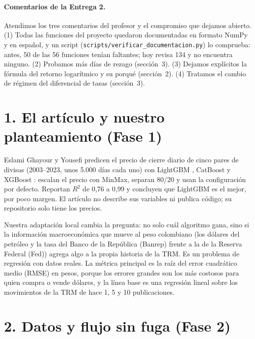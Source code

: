 \documentclass[11pt,letterpaper]{article}
\begin{document}
\paragraph{Comentarios de la Entrega 2.} Atendimos los tres comentarios del profesor y el compromiso que dejamos abierto. (1) Todas las funciones del proyecto quedaron documentadas en formato NumPy y en español, y un script (\texttt{scripts/verificar\_documentacion.py}) lo comprueba: antes, 50 de las 56 funciones tenían faltantes; hoy revisa 134 y no encuentra ninguno. (2) Probamos más días de rezago (sección~3). (3) Dejamos explícitos la fórmula del retorno logarítmico y su porqué (sección~2). (4) Tratamos el cambio de régimen del diferencial de tasas (sección~3).

\section*{1. El artículo y nuestro planteamiento (Fase 1)}

Eslami Ghayour y Yousefi \cite{articulo} predicen el precio de cierre diario de cinco pares de divisas (2003--2023, unos 5.000 días cada uno) con LightGBM \cite{lightgbm}, CatBoost \cite{catboost} y XGBoost \cite{xgboost}: escalan el precio con MinMax, separan 80/20 y usan la configuración por defecto. Reportan $R^2$ de 0,76 a 0,99 y concluyen que LightGBM es el mejor, por poco margen. El artículo no describe sus variables ni publica código; su repositorio solo tiene los precios.

Nuestra adaptación local cambia la pregunta: no solo cuál algoritmo gana, sino si la información macroeconómica que mueve al peso colombiano (los dólares del petróleo y la tasa del Banco de la República (Banrep) frente a la de la Reserva Federal (Fed)) agrega algo a la propia historia de la TRM. Es un problema de regresión con datos reales. La métrica principal es la raíz del error cuadrático medio (RMSE) en pesos, porque los errores grandes son los más costosos para quien compra o vende dólares, y la línea base es una regresión lineal sobre los movimientos de la TRM de hace 1, 5 y 10 publicaciones.

\section*{2. Datos y flujo sin fuga (Fase 2)}
\end{document}
